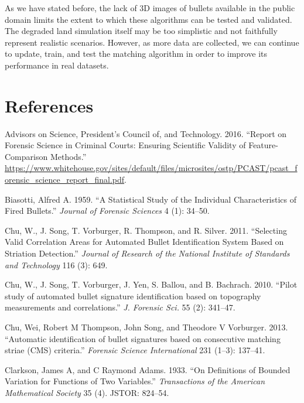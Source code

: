 \documentclass[12pt,]{article}
\theoremstyle{definition}
\theoremstyle{definition}
\theoremstyle{definition}
\theoremstyle{remark}
\begin{document}
As we have stated before, the lack of 3D images of bullets available in
the public domain limits the extent to which these algorithms can be
tested and validated. The degraded land simulation itself may be too
simplistic and not faithfully represent realistic scenarios. However, as
more data are collected, we can continue to update, train, and test the
matching algorithm in order to improve its performance in real datasets.

\clearpage

\section*{References}\label{references}

\hypertarget{refs}{}
\hypertarget{ref-pcast2016}{}
Advisors on Science, President's Council of, and Technology. 2016.
``Report on Forensic Science in Criminal Courts: Ensuring Scientific
Validity of Feature-Comparison Methods.''
\url{https://www.whitehouse.gov/sites/default/files/microsites/ostp/PCAST/pcast_forensic_science_report_final.pdf}.

\hypertarget{ref-biasotti:1959}{}
Biasotti, Alfred A. 1959. ``A Statistical Study of the Individual
Characteristics of Fired Bullets.'' \emph{Journal of Forensic Sciences}
4 (1): 34--50.

\hypertarget{ref-chu:2011}{}
Chu, W., J. Song, T. Vorburger, R. Thompson, and R. Silver. 2011.
``Selecting Valid Correlation Areas for Automated Bullet Identification
System Based on Striation Detection.'' \emph{Journal of Research of the
National Institute of Standards and Technology} 116 (3): 649.

\hypertarget{ref-chu:2010}{}
Chu, W., J. Song, T. Vorburger, J. Yen, S. Ballou, and B. Bachrach.
2010. ``Pilot study of automated bullet signature identification based
on topography measurements and correlations.'' \emph{J. Forensic Sci.}
55 (2): 341--47.

\hypertarget{ref-thompson:2013}{}
Chu, Wei, Robert M Thompson, John Song, and Theodore V Vorburger. 2013.
``Automatic identification of bullet signatures based on consecutive
matching striae (CMS) criteria.'' \emph{Forensic Science International}
231 (1--3): 137--41.

\hypertarget{ref-clarkson1933definitions}{}
Clarkson, James A, and C Raymond Adams. 1933. ``On Definitions of
Bounded Variation for Functions of Two Variables.'' \emph{Transactions
of the American Mathematical Society} 35 (4). JSTOR: 824--54.
\end{document}
